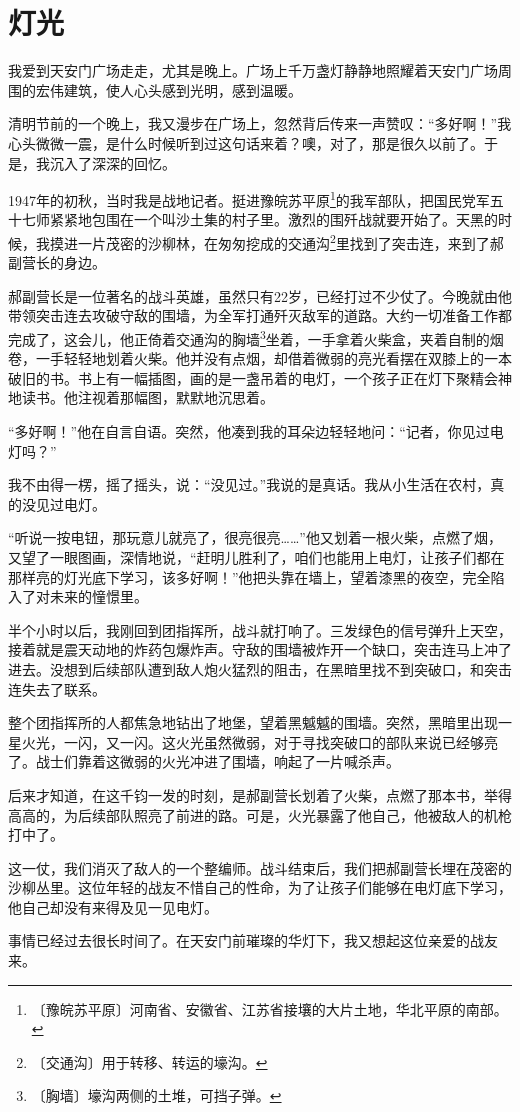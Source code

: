 \documentclass[12pt,UTF-8,openany]{ctexbook}
\begin{document}
\chapter{灯光}

\begin{Large}
    
    我爱到天安门广场走走，尤其是晚上。广场上千万盏灯静静地照耀着天安门广场周围的宏伟建筑，使人心头感到光明，感到温暖。
    
    清明节前的一个晚上，我又漫步在广场上，忽然背后传来一声赞叹：“多好啊！”我心头微微一震，是什么时候听到过这句话来着？噢，对了，那是很久以前了。于是，我沉入了深深的回忆。
    
    1947年的初秋，当时我是战地记者。挺进豫皖苏平原\footnote{〔豫皖苏平原〕河南省、安徽省、江苏省接壤的大片土地，华北平原的南部。}的我军部队，把国民党军五十七师紧紧地包围在一个叫沙土集的村子里。激烈的围歼战就要开始了。天黑的时候，我摸进一片茂密的沙柳林，在匆匆挖成的交通沟\footnote{〔交通沟〕用于转移、转运的壕沟。}里找到了突击连，来到了郝副营长的身边。
    
    郝副营长是一位著名的战斗英雄，虽然只有22岁，已经打过不少仗了。今晚就由他带领突击连去攻破守敌的围墙，为全军打通歼灭敌军的道路。大约一切准备工作都完成了，这会儿，他正倚着交通沟的胸墙\footnote{〔胸墙〕壕沟两侧的土堆，可挡子弹。}坐着，一手拿着火柴盒，夹着自制的烟卷，一手轻轻地划着火柴。他并没有点烟，却借着微弱的亮光看摆在双膝上的一本破旧的书。书上有一幅插图，画的是一盏吊着的电灯，一个孩子正在灯下聚精会神地读书。他注视着那幅图，默默地沉思着。
    
    “多好啊！”他在自言自语。突然，他凑到我的耳朵边轻轻地问：“记者，你见过电灯吗？”
    
    我不由得一楞，摇了摇头，说：“没见过。”我说的是真话。我从小生活在农村，真的没见过电灯。
    
    “听说一按电钮，那玩意儿就亮了，很亮很亮……”他又划着一根火柴，点燃了烟，又望了一眼图画，深情地说，“赶明儿胜利了，咱们也能用上电灯，让孩子们都在那样亮的灯光底下学习，该多好啊！”他把头靠在墙上，望着漆黑的夜空，完全陷入了对未来的憧憬里。
    
    半个小时以后，我刚回到团指挥所，战斗就打响了。三发绿色的信号弹升上天空，接着就是震天动地的炸药包爆炸声。守敌的围墙被炸开一个缺口，突击连马上冲了进去。没想到后续部队遭到敌人炮火猛烈的阻击，在黑暗里找不到突破口，和突击连失去了联系。
    
    整个团指挥所的人都焦急地钻出了地堡，望着黑魆魆的围墙。突然，黑暗里出现一星火光，一闪，又一闪。这火光虽然微弱，对于寻找突破口的部队来说已经够亮了。战士们靠着这微弱的火光冲进了围墙，响起了一片喊杀声。
    
    后来才知道，在这千钧一发的时刻，是郝副营长划着了火柴，点燃了那本书，举得高高的，为后续部队照亮了前进的路。可是，火光暴露了他自己，他被敌人的机枪打中了。
    
    这一仗，我们消灭了敌人的一个整编师。战斗结束后，我们把郝副营长埋在茂密的沙柳丛里。这位年轻的战友不惜自己的性命，为了让孩子们能够在电灯底下学习，他自己却没有来得及见一见电灯。
    
    事情已经过去很长时间了。在天安门前璀璨的华灯下，我又想起这位亲爱的战友来。
    
\end{Large}
\end{document}
